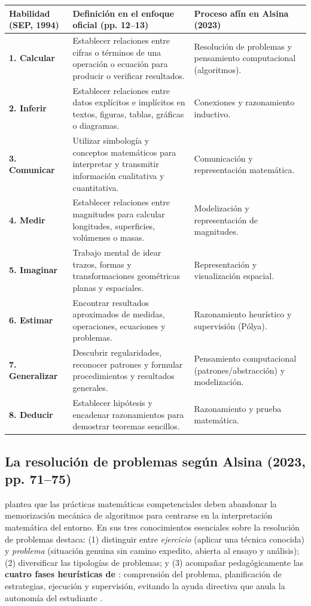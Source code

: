 \documentclass[spanish,letterpaper,oneside]{article}
\begin{document}
{\small{}\renewcommand{\arraystretch}{1.18}
\noindent\begin{tabularx}{\textwidth}{|>{\raggedright\arraybackslash}p{}|>{\raggedright\arraybackslash}X|>{\raggedright\arraybackslash}p{}|}\hline
\rowcolor{iiiepePale} \textbf{Habilidad (SEP, 1994)} & \textbf{Definición en el enfoque oficial (pp. 12--13)} & \textbf{Proceso afín en Alsina (2023)} \\\hline
\textbf{1. Calcular} & Establecer relaciones entre cifras o términos de una operación o ecuación para producir o verificar resultados. & Resolución de problemas y pensamiento computacional (algoritmos). \\\hline
\textbf{2. Inferir} & Establecer relaciones entre datos explícitos e implícitos en textos, figuras, tablas, gráficas o diagramas. & Conexiones y razonamiento inductivo. \\\hline
\textbf{3. Comunicar} & Utilizar simbología y conceptos matemáticos para interpretar y transmitir información cualitativa y cuantitativa. & Comunicación y representación matemática. \\\hline
\textbf{4. Medir} & Establecer relaciones entre magnitudes para calcular longitudes, superficies, volúmenes o masas. & Modelización y representación de magnitudes. \\\hline
\textbf{5. Imaginar} & Trabajo mental de idear trazos, formas y transformaciones geométricas planas y espaciales. & Representación y visualización espacial. \\\hline
\textbf{6. Estimar} & Encontrar resultados aproximados de medidas, operaciones, ecuaciones y problemas. & Razonamiento heurístico y supervisión (Pólya). \\\hline
\textbf{7. Generalizar} & Descubrir regularidades, reconocer patrones y formular procedimientos y resultados generales. & Pensamiento computacional (patrones/abstracción) y modelización. \\\hline
\textbf{8. Deducir} & Establecer hipótesis y encadenar razonamientos para demostrar teoremas sencillos. & Razonamiento y prueba matemática. \\\hline
\end{tabularx}}
\vspace{4pt}

\subsection{La resolución de problemas según Alsina (2023, pp. 71--75)}
\citet{alsina2023} plantea que las prácticas matemáticas competenciales deben abandonar la memorización mecánica de algoritmos para centrarse en la interpretación matemática del entorno. En sus tres conocimientos esenciales sobre la resolución de problemas destaca: (1) distinguir entre \textit{ejercicio} (aplicar una técnica conocida) y \textit{problema} (situación genuina sin camino expedito, abierta al ensayo y análisis); (2) diversificar las tipologías de problemas; y (3) acompañar pedagógicamente las \textbf{cuatro fases heurísticas de \citet{polya1945}}: comprensión del problema, planificación de estrategias, ejecución y supervisión, evitando la ayuda directiva que anula la autonomía del estudiante \citep{alsina_planas2008}.
\end{document}
